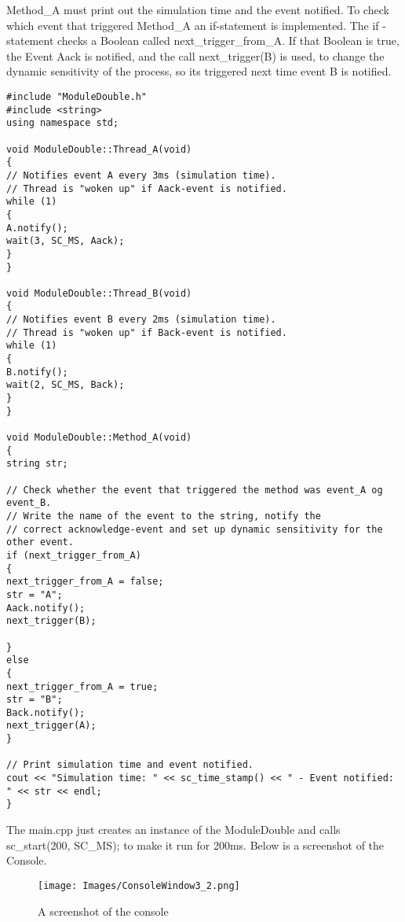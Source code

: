 Method\_A must print out the simulation time and the event notified. To check which event that triggered Method\_A an if-statement is implemented. The if -statement checks a Boolean called next\_trigger\_from\_A. If that Boolean is true, the Event Aack is notified, and the call next\_trigger(B) is used, to change the dynamic sensitivity of the process, so its triggered next time event B is notified. 

\begin{lstlisting}
#include "ModuleDouble.h"
#include <string>
using namespace std;

void ModuleDouble::Thread_A(void)
{
// Notifies event A every 3ms (simulation time).
// Thread is "woken up" if Aack-event is notified.
while (1)
{
A.notify();
wait(3, SC_MS, Aack);
}
}

void ModuleDouble::Thread_B(void)
{
// Notifies event B every 2ms (simulation time).
// Thread is "woken up" if Back-event is notified.
while (1)
{
B.notify();
wait(2, SC_MS, Back);
}
}

void ModuleDouble::Method_A(void)
{
string str;

// Check whether the event that triggered the method was event_A og event_B.
// Write the name of the event to the string, notify the 
// correct acknowledge-event and set up dynamic sensitivity for the other event.
if (next_trigger_from_A)
{
next_trigger_from_A = false;
str = "A";
Aack.notify();
next_trigger(B);

}
else
{
next_trigger_from_A = true;
str = "B";
Back.notify();
next_trigger(A);
}

// Print simulation time and event notified.
cout << "Simulation time: " << sc_time_stamp() << " - Event notified: " << str << endl;
}
\end{lstlisting}


The main.cpp just creates an instance of the ModuleDouble and calls sc\_start(200, SC\_MS); to make it run for 200ms. 
Below is a screenshot of the Console.

\begin{figure}[H]
	\centering
	\texttt{[image: Images/ConsoleWindow3\_2.png]}
	\caption{A screenshot of the console}
	\label{fig:ConsoleWindow_3_2}
\end{figure}

